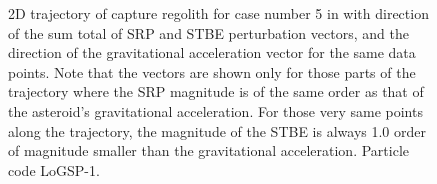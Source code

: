 \begin{figure}[htb]
\centering
\captionsetup{justification=centering}
\caption{2D trajectory of capture regolith for case number 5 in  with direction of the sum total of \gls{SRP} and \gls{STBE} perturbation vectors, and the direction of the gravitational acceleration vector for the same data points. Note that the vectors are shown only for those parts of the trajectory where the \gls{SRP} magnitude is of the same order as that of the asteroid's gravitational acceleration. For those very same points along the trajectory, the magnitude of the \gls{STBE} is always 1.0 order of magnitude smaller than the gravitational acceleration. Particle code LoGSP-1.}
\end{figure}
